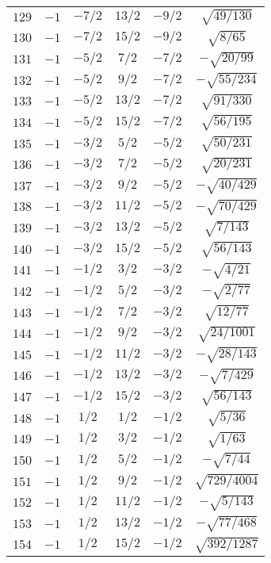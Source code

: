 \begin{table}
\begin{center}
\begin{tabular}{|c|c|c|c|c|c|}
$129$ & $-1$ & $-7/2$ & $13/2$ & $-9/2$ & $\sqrt{49/130}$ \\ 
$130$ & $-1$ & $-7/2$ & $15/2$ & $-9/2$ & $\sqrt{8/65}$ \\ 
$131$ & $-1$ & $-5/2$ & $7/2$ & $-7/2$ & $-\sqrt{20/99}$ \\ 
$132$ & $-1$ & $-5/2$ & $9/2$ & $-7/2$ & $-\sqrt{55/234}$ \\ 
$133$ & $-1$ & $-5/2$ & $13/2$ & $-7/2$ & $\sqrt{91/330}$ \\ 
$134$ & $-1$ & $-5/2$ & $15/2$ & $-7/2$ & $\sqrt{56/195}$ \\ 
$135$ & $-1$ & $-3/2$ & $5/2$ & $-5/2$ & $\sqrt{50/231}$ \\ 
$136$ & $-1$ & $-3/2$ & $7/2$ & $-5/2$ & $\sqrt{20/231}$ \\ 
$137$ & $-1$ & $-3/2$ & $9/2$ & $-5/2$ & $-\sqrt{40/429}$ \\ 
$138$ & $-1$ & $-3/2$ & $11/2$ & $-5/2$ & $-\sqrt{70/429}$ \\ 
$139$ & $-1$ & $-3/2$ & $13/2$ & $-5/2$ & $\sqrt{7/143}$ \\ 
$140$ & $-1$ & $-3/2$ & $15/2$ & $-5/2$ & $\sqrt{56/143}$ \\ 
$141$ & $-1$ & $-1/2$ & $3/2$ & $-3/2$ & $-\sqrt{4/21}$ \\ 
$142$ & $-1$ & $-1/2$ & $5/2$ & $-3/2$ & $-\sqrt{2/77}$ \\ 
$143$ & $-1$ & $-1/2$ & $7/2$ & $-3/2$ & $\sqrt{12/77}$ \\ 
$144$ & $-1$ & $-1/2$ & $9/2$ & $-3/2$ & $\sqrt{24/1001}$ \\ 
$145$ & $-1$ & $-1/2$ & $11/2$ & $-3/2$ & $-\sqrt{28/143}$ \\ 
$146$ & $-1$ & $-1/2$ & $13/2$ & $-3/2$ & $-\sqrt{7/429}$ \\ 
$147$ & $-1$ & $-1/2$ & $15/2$ & $-3/2$ & $\sqrt{56/143}$ \\ 
$148$ & $-1$ & $1/2$ & $1/2$ & $-1/2$ & $\sqrt{5/36}$ \\ 
$149$ & $-1$ & $1/2$ & $3/2$ & $-1/2$ & $\sqrt{1/63}$ \\ 
$150$ & $-1$ & $1/2$ & $5/2$ & $-1/2$ & $-\sqrt{7/44}$ \\ 
$151$ & $-1$ & $1/2$ & $9/2$ & $-1/2$ & $\sqrt{729/4004}$ \\ 
$152$ & $-1$ & $1/2$ & $11/2$ & $-1/2$ & $-\sqrt{5/143}$ \\ 
$153$ & $-1$ & $1/2$ & $13/2$ & $-1/2$ & $-\sqrt{77/468}$ \\ 
$154$ & $-1$ & $1/2$ & $15/2$ & $-1/2$ & $\sqrt{392/1287}$ \\ 

\end{tabular}
\end{center}
\end{table}
